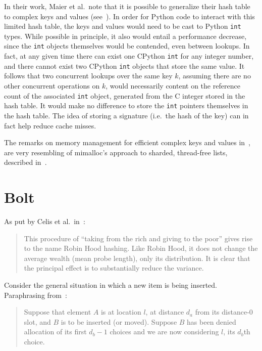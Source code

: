 In their work, Maier et al.\ note that it is possible to generalize their hash table to complex keys and values (see~\cite[\S5.7]{maier}).
In order for Python code to interact with this limited hash table, the keys and values would need to be cast to Python \texttt{int} types.
While possible in principle, it also would entail a performance decrease, since the \texttt{int} objects themselves would be contended, even between lookups.
In fact, at any given time there can exist one CPython \texttt{int} for any integer number, and there cannot exist two CPython \texttt{int} objects that store the same value.
It follows that two concurrent lookups over the same key $k$, assuming there are no other concurrent operations on $k$, would necessarily content on the reference count of the associated \texttt{int} object, generated from the C integer stored in the hash table.
It would make no difference to store the \texttt{int} pointers themselves in the hash table.
The idea of storing a signature (i.e.\ the hash of the key) can in fact help reduce cache misses.

The remarks on memory management for efficient complex keys and values in~\cite[\S5.7]{maier}, are very resembling of mimalloc's approach to sharded, thread-free lists, described in~\cite{mimalloc}.


\section{Bolt}\label{sec:bolt}

\cite{bolt}

As put by Celis et al.\ in~\cite{robin-hood}:
\begin{quote}
	This procedure of ``taking from the rich and giving to the poor'' gives rise to the name Robin Hood hashing.
	Like Robin Hood, it does not change the average wealth (mean probe length), only its distribution.
	It is clear that the principal effect is to substantially reduce the variance.
\end{quote}


Consider the general situation in which a new item is being inserted.
Paraphrasing from~\cite{robin-hood}:
\begin{quote}
	Suppose that element $A$ is at location $l$, at distance $d_a$ from its distance-0 slot, and $B$ is to be inserted (or moved).
	Suppose $B$ has been denied allocation of its first $d_b - 1$ choices and we are now considering $l$, its $d_b$th choice.
\end{quote}


